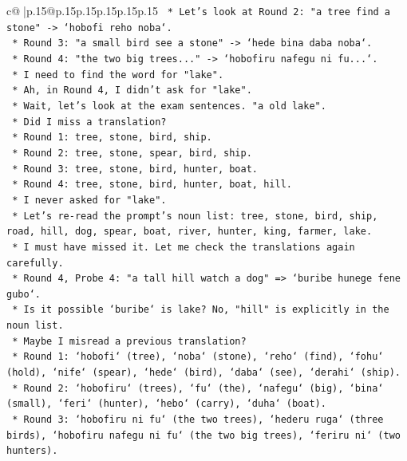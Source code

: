 \documentclass{article}
\begin{document}
{\begin{supertabular}{c@{$\;$}|p{.15\linewidth}@{}p{.15\linewidth}p{.15\linewidth}p{.15\linewidth}p{.15\linewidth}p{.15\linewidth}}
{{{\texttt{            *   Let's look at Round 2: "a tree find a stone" {-}> `hobofi reho noba`.} \\
\texttt{            *   Round 3: "a small bird see a stone" {-}> `hede bina daba noba`.} \\
\texttt{            *   Round 4: "the two big trees..." {-}> `hobofiru nafegu ni fu...`.} \\
\texttt{            *   I need to find the word for "lake".} \\
\texttt{            *   Ah, in Round 4, I didn't ask for "lake".} \\
\texttt{            *   Wait, let's look at the exam sentences. "a old lake".} \\
\texttt{            *   Did I miss a translation?} \\
\texttt{            *   Round 1: tree, stone, bird, ship.} \\
\texttt{            *   Round 2: tree, stone, spear, bird, ship.} \\
\texttt{            *   Round 3: tree, stone, bird, hunter, boat.} \\
\texttt{            *   Round 4: tree, stone, bird, hunter, boat, hill.} \\
\texttt{            *   I never asked for "lake".} \\
\texttt{            *   Let's re{-}read the prompt's noun list: tree, stone, bird, ship, road, hill, dog, spear, boat, river, hunter, king, farmer, lake.} \\
\texttt{            *   I must have missed it. Let me check the translations again carefully.} \\
\texttt{            *   Round 4, Probe 4: "a tall hill watch a dog" => `buribe hunege fene gubo`.} \\
\texttt{            *   Is it possible `buribe` is lake? No, "hill" is explicitly in the noun list.} \\
\texttt{            *   Maybe I misread a previous translation?} \\
\texttt{            *   Round 1: `hobofi` (tree), `noba` (stone), `reho` (find), `fohu` (hold), `nife` (spear), `hede` (bird), `daba` (see), `derahi` (ship).} \\
\texttt{            *   Round 2: `hobofiru` (trees), `fu` (the), `nafegu` (big), `bina` (small), `feri` (hunter), `hebo` (carry), `duha` (boat).} \\
\texttt{            *   Round 3: `hobofiru ni fu` (the two trees), `hederu ruga` (three birds), `hobofiru nafegu ni fu` (the two big trees), `feriru ni` (two hunters).} \\
}}}
\end{supertabular}}
\end{document}
